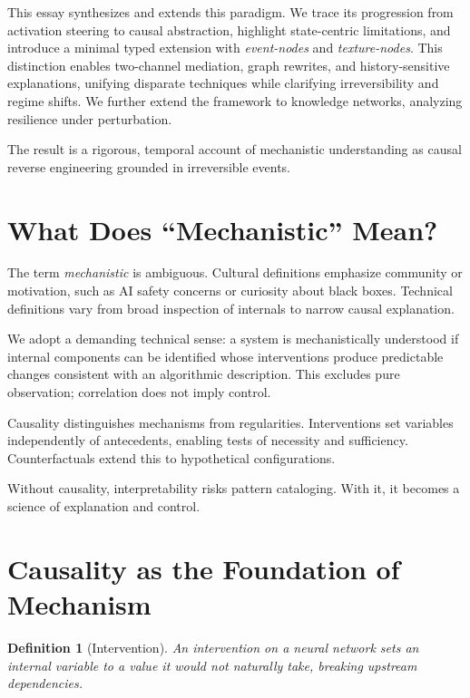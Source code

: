 \documentclass[11pt]{article}
\newtheorem{definition}{Definition}
\theoremstyle{remark}
\begin{document}
This essay synthesizes and extends this paradigm. We trace its progression from activation steering to causal abstraction, highlight state-centric limitations, and introduce a minimal typed extension with \emph{event-nodes} and \emph{texture-nodes}. This distinction enables two-channel mediation, graph rewrites, and history-sensitive explanations, unifying disparate techniques while clarifying irreversibility and regime shifts. We further extend the framework to knowledge networks, analyzing resilience under perturbation.

The result is a rigorous, temporal account of mechanistic understanding as causal reverse engineering grounded in irreversible events.

\section{What Does ``Mechanistic'' Mean?}

The term \emph{mechanistic} is ambiguous. Cultural definitions emphasize community or motivation, such as AI safety concerns or curiosity about black boxes. Technical definitions vary from broad inspection of internals to narrow causal explanation.

We adopt a demanding technical sense: a system is mechanistically understood if internal components can be identified whose interventions produce predictable changes consistent with an algorithmic description. This excludes pure observation; correlation does not imply control.

Causality distinguishes mechanisms from regularities. Interventions set variables independently of antecedents, enabling tests of necessity and sufficiency. Counterfactuals extend this to hypothetical configurations.

Without causality, interpretability risks pattern cataloging. With it, it becomes a science of explanation and control.

\section{Causality as the Foundation of Mechanism}

\begin{definition}[Intervention]
An intervention on a neural network sets an internal variable to a value it would not naturally take, breaking upstream dependencies.
\end{definition}
\end{document}
